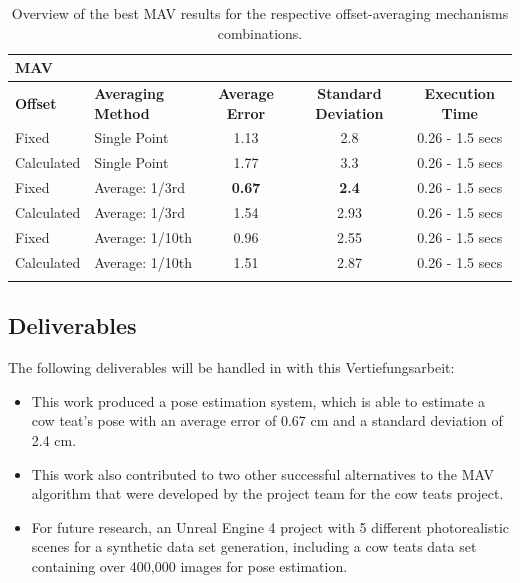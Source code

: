 \begin{longtable}{|l|l||c|c|c|}                                              \hline
\multicolumn{5}{|l|}{\textbf{MAV}}                                                       \\\hline
\textbf{Offset}         & \textbf{Averaging Method}   
& \textbf{Average Error}  & \textbf{Standard Deviation}  & \textbf{Execution Time}                 \\ \hline
Fixed                   & Single Point                & 1.13            & 2.8              & 0.26 - 1.5 secs   \\ \hline
Calculated              & Single Point                & 1.77            & 3.3              & 0.26 - 1.5 secs   \\ \hline
Fixed                   & Average: 1/3rd              & \textbf{0.67}   & \textbf{2.4}     & 0.26 - 1.5 secs                     \\ \hline
Calculated              & Average: 1/3rd              & 1.54            & 2.93             & 0.26 - 1.5 secs    \\ \hline
Fixed                   & Average: 1/10th             & 0.96            & 2.55             & 0.26 - 1.5 secs     \\ \hline
Calculated              & Average: 1/10th             & 1.51            & 2.87             & 0.26 - 1.5 secs    \\ \hline
\caption{Overview of the best MAV results for the respective offset-averaging mechanisms combinations.} \label{tab:mav-results}                          
\end{longtable}



\subsection{Deliverables}
The following deliverables will be handled in with this Vertiefungsarbeit:
\begin{itemize}
    \item This work produced a pose estimation system, which is able to estimate a cow teat's pose with an average error of 0.67 cm and a standard deviation of 2.4 cm. 
    \item This work also contributed to two other successful alternatives to the MAV algorithm that were developed by the project team for the cow teats project.
    \item For future research, an Unreal Engine 4 project with 5 different photorealistic scenes for a synthetic data set generation, including a cow teats data set containing over 400,000 images for pose estimation.
\end{itemize}